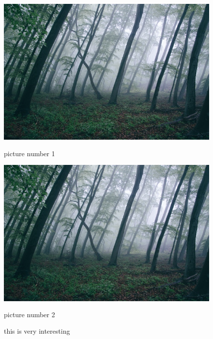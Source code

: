 \begin{frame}
    \begin{figure}[!tbp]
        \centering
        \begin{minipage}{0.5\textwidth}
            \includegraphics[width=\textwidth]{pictureSlides/test-image.jpg}
            \caption{picture number 1}
        \end{minipage}
        \hfill
        \begin{minipage}{0.4\textwidth}
            \includegraphics[width=\textwidth]{pictureSlides/test-image.jpg}
            \caption{picture number 2}
        \end{minipage}
        \caption{this is very interesting}
    \end{figure}
\end{frame}

